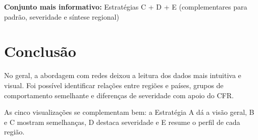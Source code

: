 \documentclass[12pt,a4paper]{article}
\begin{document}
\textbf{Conjunto mais informativo:} Estratégias C + D + E (complementares para padrão, severidade e síntese regional)

\section{Conclusão}

No geral, a abordagem com redes deixou a leitura dos dados mais intuitiva e visual. Foi possível identificar relações entre regiões e países, grupos de comportamento semelhante e diferenças de severidade com apoio do CFR.

As cinco visualizações se complementam bem: a Estratégia A dá a visão geral, B e C mostram semelhanças, D destaca severidade e E resume o perfil de cada região.
\end{document}
